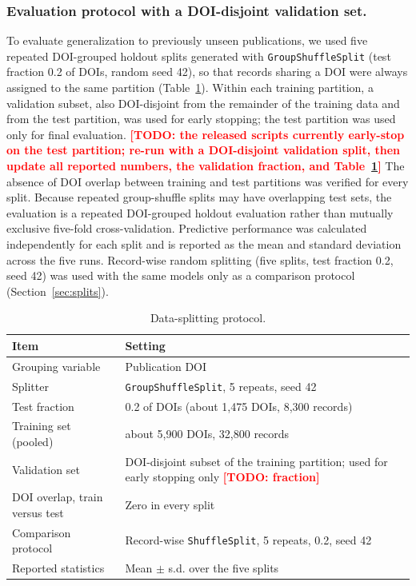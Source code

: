 \documentclass[3p]{elsarticle}
\newcommand{\authortodo}[1]{\textcolor{red}{\textbf{[TODO: #1]}}}
\begin{document}
\subsubsection{Evaluation protocol with a DOI-disjoint validation set.}
To evaluate generalization to previously unseen publications, we used five repeated DOI-grouped holdout splits generated with \texttt{GroupShuffleSplit} (test fraction 0.2 of DOIs, random seed 42), so that records sharing a DOI were always assigned to the same partition (Table~\ref{tab:protocol}). Within each training partition, a validation subset, also DOI-disjoint from the remainder of the training data and from the test partition, was used for early stopping; the test partition was used only for final evaluation. \authortodo{the released scripts currently early-stop on the test partition; re-run with a DOI-disjoint validation split, then update all reported numbers, the validation fraction, and Table~\ref{tab:protocol}} The absence of DOI overlap between training and test partitions was verified for every split. Because repeated group-shuffle splits may have overlapping test sets, the evaluation is a repeated DOI-grouped holdout evaluation rather than mutually exclusive five-fold cross-validation. Predictive performance was calculated independently for each split and is reported as the mean and standard deviation across the five runs. Record-wise random splitting (five splits, test fraction 0.2, seed 42) was used with the same models only as a comparison protocol (Section~\ref{sec:splits}).

\begin{table}[t]
\centering\small
\caption{Data-splitting protocol.}
\label{tab:protocol}
\begin{tabular}{ll}
\toprule
Item & Setting \\
\midrule
Grouping variable & Publication DOI \\
Splitter & \texttt{GroupShuffleSplit}, 5 repeats, seed 42 \\
Test fraction & 0.2 of DOIs (about 1,475 DOIs, 8,300 records) \\
Training set (pooled) & about 5,900 DOIs, 32,800 records \\
Validation set & DOI-disjoint subset of the training partition; used for early stopping only \authortodo{fraction} \\
DOI overlap, train versus test & Zero in every split \\
Comparison protocol & Record-wise \texttt{ShuffleSplit}, 5 repeats, 0.2, seed 42 \\
Reported statistics & Mean $\pm$ s.d. over the five splits \\
\bottomrule
\end{tabular}
\end{table}
\end{document}
